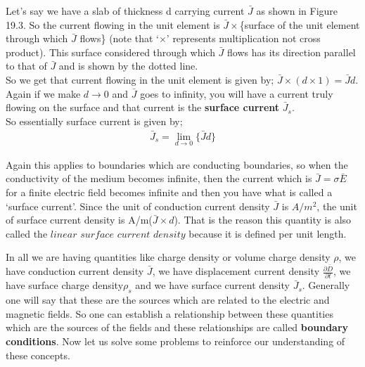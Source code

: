 Let's say we have a slab of thickness d carrying current $\bar{J}$ as shown in Figure 19.3. So the current flowing in the unit element is $\bar{J}\times$\{surface of the unit element through which $\bar{J}$ flows\} (note that `$\times$' represents multiplication not cross product).
This surface considered through which $\bar{J}$ flows has its direction parallel to that of $\bar{J}$ and is shown by the dotted line.\\ 
So we get that current flowing in the unit element is given by; $\bar{J}\times(d\times1)=\bar{J}d$. Again if we make $d\rightarrow0$ and $\bar{J}$ goes to infinity, you will have a current truly flowing on the surface and that current is the \textbf{surface current} $\bar{J}_{s}$. \\
So essentially surface current is given by;
\begin{align}
\bar{J}_{s}=\lim_{d\rightarrow0}\{\bar{J}d\}
\end{align}


Again this applies to boundaries which are conducting boundaries, so when the conductivity of the medium becomes infinite, then the current which is $\bar{J}=\sigma\bar{E}$ for a finite electric field becomes infinite and then you have what is called a `surface current'. Since the unit of conduction current density $\bar{J}$ is $A/m^{2}$, the unit of surface current density is A/m($\bar{J}\times d$). That is the reason this quantity is also called the $linear$ $surface$ $current$ $density$ because it is defined per unit length.


In all we are having quantities like charge density or volume charge density $\rho$, we have conduction current density $\bar{J}$, we have displacement current density $\frac{\partial\bar{D}}{\partial t}$, we have surface charge density$\rho_{s}$ and we have surface current density $\bar{J}_{s}$. Generally one will say that these are the sources which are related to the electric and magnetic fields. So one can establish a relationship between these quantities which are the sources of the fields and these relationships are called \textbf{ boundary conditions}. Now let us solve some problems to reinforce our understanding of these concepts.

